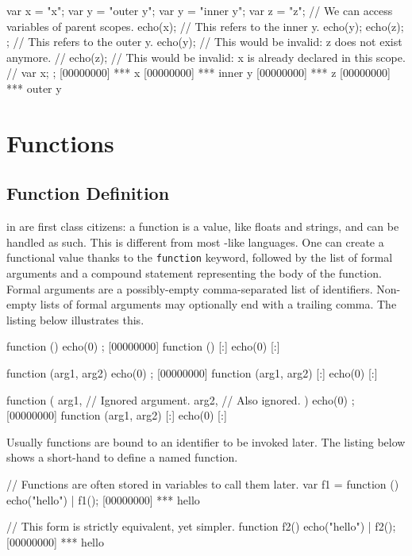 \begin{urbiscript}
{
  var x = "x";
  var y = "outer y";
  {
    var y = "inner y";
    var z = "z";
    // We can access variables of parent scopes.
    echo(x);
    // This refers to the inner y.
    echo(y);
    echo(z);
  };
  // This refers to the outer y.
  echo(y);
  // This would be invalid: z does not exist anymore.
  // echo(z);
  // This would be invalid: x is already declared in this scope.
  // var x;
};
[00000000] *** x
[00000000] *** inner y
[00000000] *** z
[00000000] *** outer y
\end{urbiscript}


\section{Functions}

\subsection{Function Definition}

 in \us are first class citizens: a function is a
value, like floats and strings, and can be handled as such.  This is
different from most \C-like languages.  One can create a functional
value thanks to the \lstinline|function| keyword, followed by the list
of formal arguments and a compound statement representing the body of
the function. Formal arguments are a possibly-empty comma-separated
list of identifiers.  Non-empty lists of formal arguments may
optionally end with a trailing comma. The listing below illustrates
this.

\begin{urbiscript}
function () { echo(0) };
[00000000] function () {
[:]  echo(0)
[:]}

function (arg1, arg2) { echo(0) };
[00000000] function (arg1, arg2) {
[:]  echo(0)
[:]}

function (
           arg1, // Ignored argument.
           arg2, // Also ignored.
          )
{
  echo(0)
};
[00000000] function (arg1, arg2) {
[:]  echo(0)
[:]}
\end{urbiscript}

Usually functions are bound to an identifier to be invoked later.
The listing below shows a short-hand to define a named
function.

\begin{urbiscript}
// Functions are often stored in variables to call them later.
var f1 = function () {
  echo("hello")
}|
f1();
[00000000] *** hello

// This form is strictly equivalent, yet simpler.
function f2()
{
  echo("hello")
}|
f2();
[00000000] *** hello
\end{urbiscript}


